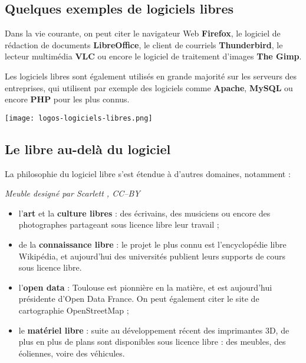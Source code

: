 \subsection{Quelques exemples de logiciels libres}

\begin{minipage}{0.7\textwidth}
Dans la vie courante, on peut citer le navigateur Web \textbf{Firefox}, 
le logiciel de rédaction de documents \textbf{LibreOffice}, le 
client de courriels \textbf{Thunderbird}, le lecteur 
multimédia \textbf{VLC} ou encore le logiciel de traitement 
d’images \textbf{The Gimp}.

\Separateur

Les logiciels libres sont également utilisés en grande majorité sur 
les serveurs des entreprises, qui utilisent par exemple des 
logiciels comme \textbf{Apache}, \textbf{MySQL} ou 
encore \textbf{PHP} pour les plus connus.
\end{minipage}
\begin{minipage}{0.3\textwidth}
\begin{center}
\texttt{[image: logos-logiciels-libres.png]}
\end{center}
\end{minipage}

\subsection{Le libre au-delà du logiciel}

La philosophie du logiciel libre s’est étendue à d’autres domaines,
 notamment :

\begin{minipage}{0.3\textwidth}
\begin{center}
\textit{Meuble designé par Scarlett , CC--BY}
\end{center}
\end{minipage}
\begin{minipage}{0.7\textwidth}
\begin{itemize}[label=$\bullet$]
\item l'\textbf{art} et la \textbf{culture libres} : 
des écrivains, des musiciens 
ou encore des photographes partageant sous licence libre leur travail ;
\item de la \textbf{connaissance libre} : le projet le plus connu est 
l’encyclopédie libre Wikipédia, et aujourd'hui des universités 
publient leurs supports de cours sous licence libre. 
\item l'\textbf{open data} : Toulouse est pionnière en la matière, 
et est aujourd'hui présidente d’Open Data France. On peut également 
citer le site de cartographie \mbox{OpenStreetMap} ;
\item le \textbf{matériel libre} : suite au développement 
récent des imprimantes 3D, de plus en plus de plans sont disponibles
 sous licence libre : des meubles, des éoliennes, voire des véhicules.
\end{itemize}
\end{minipage}


